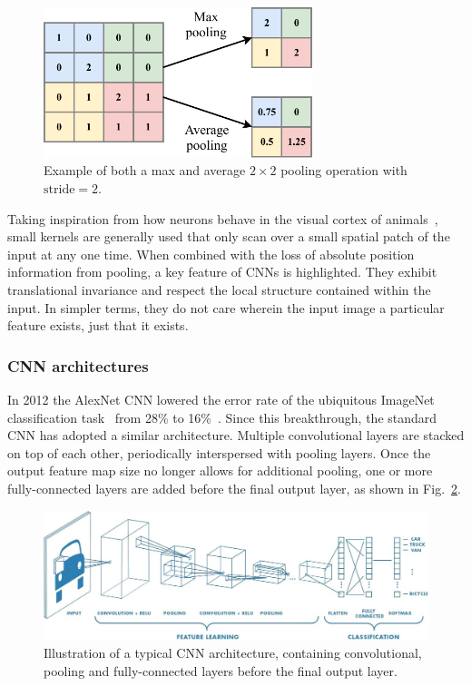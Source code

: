 \begin{figure} %
    \includegraphics[width=0.7\textwidth]{diagrams/6-cvn/pooling.pdf}
    \caption[Example of pooling operation.]
    {Example of both a max and average $2 \times 2$ pooling operation with $\mathrm{stride}=2$.}
    \label{fig:pooling}
\end{figure}

Taking inspiration from how neurons behave in the visual cortex of animals~\cite{lecun2015}, small
kernels are generally used that only scan over a small spatial patch of the input at any one time.
When combined with the loss of absolute position information from pooling, a key feature of CNNs
is highlighted. They exhibit translational invariance and respect the local structure contained
within the input. In simpler terms, they do not care wherein the input image a particular feature
exists, just that it exists.

\subsubsection*{CNN architectures}

In 2012 the AlexNet CNN lowered the error rate of the ubiquitous ImageNet classification
task~\cite{deng2009} from 28\% to 16\%~\cite{krizhevsky2012}. Since this breakthrough, the
standard CNN has adopted a similar architecture. Multiple convolutional layers are stacked on top
of each other, periodically interspersed with pooling layers. Once the output feature map size no
longer allows for additional pooling, one or more fully-connected layers are added before the
final output layer, as shown in Fig.~\ref{fig:conv_diagram}.

\begin{figure} %
    \includegraphics[width=\textwidth]{diagrams/6-cvn/conv_diagram.jpeg}
    \caption[Typical CNN architecture]
    {Illustration of a typical CNN architecture, containing convolutional, pooling and
        fully-connected layers before the final output layer.}
    \label{fig:conv_diagram}
\end{figure}

